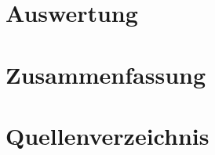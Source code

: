 \documentclass[ngerman,a4paper,parskip=half]{scrartcl}
\begin{document}

\section{Auswertung}


\section{Zusammenfassung}


\section{Quellenverzeichnis}

\end{document}
